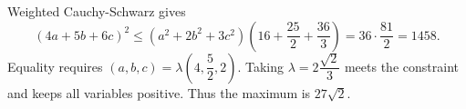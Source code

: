 Weighted Cauchy-Schwarz gives
\[
(4a+5b+6c)^2
\le(a^2+2b^2+3c^2)\left(16+\dfrac{25}{2}+\dfrac{36}{3}\right)
=36\cdot\dfrac{81}{2}=1458.
\]
Equality requires $(a,b,c)=\lambda(4,\dfrac{5}{2},2)$. Taking $\lambda=2\dfrac{\sqrt 2}{3}$ meets the constraint and keeps all variables positive. Thus the maximum is $\boxed{27\sqrt2}$.
